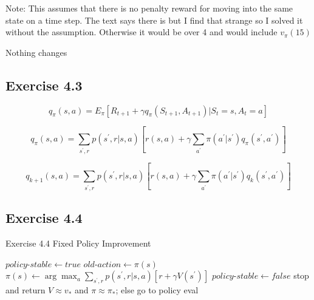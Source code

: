 Note: This assumes that there is no penalty reward for moving into the same state on a time step. The text says there is but I find that strange so I solved it without the assumption. Otherwise it would be over 4 and would include $v_\pi(15)$

Nothing changes

\subsection{Exercise 4.3}
\begin{equation}
  q_\pi(s,a) = E_\pi[R_{t+1} + \gamma q_\pi(S_{t+1},A_{t+1}) | S_t = s, A_t = a]
\end{equation}

\begin{equation}
  q_\pi(s,a) = \sum_{s^\prime, r} p(s^\prime, r| s,a)[r(s,a) + \gamma \sum_{a^\prime} \pi(a^\prime|s^\prime) q_\pi(s^\prime, a^\prime)]
\end{equation}

\begin{equation}
  q_{k+1}(s,a) = \sum_{s^\prime, r} p(s^\prime, r| s,a)[r(s,a) + \gamma \sum_{a^\prime} \pi(a^\prime|s^\prime) q_k(s^\prime, a^\prime)]
\end{equation}

\subsection{Exercise 4.4}

\begin{algorithm}
  \caption{Exercise 4.4 Fixed Policy Improvement}\label{euclid}
  \begin{algorithmic}[1]
  \State $policy \text{-} stable \gets true$
  \State $old \text{-} action \gets \pi(s)$ 
  \State $\pi(s) \gets \arg \max_a \sum_{s^\prime,r} p(s^\prime, r | s,a)[r+ \gamma V(s^\prime)]$
   $policy \text{-} stable \gets false$
  \EndIf
  \EndFor
   stop and return $V \approx v_*$ and $\pi \approx \pi_*$; else go to policy eval
  \EndIf
  \end{algorithmic}
  \end{algorithm}
